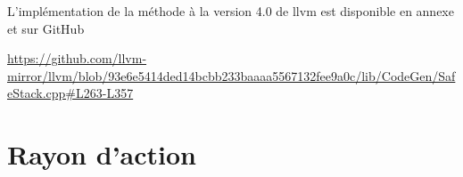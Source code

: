 L'implémentation de la méthode à la version 4.0 de \gls{llvm} est disponible en annexe et sur GitHub

\url{https://github.com/llvm-mirror/llvm/blob/93e6e5414ded14bcbb233baaaa5567132fee9a0c/lib/CodeGen/SafeStack.cpp#L263-L357}



\section{Rayon d'action}

